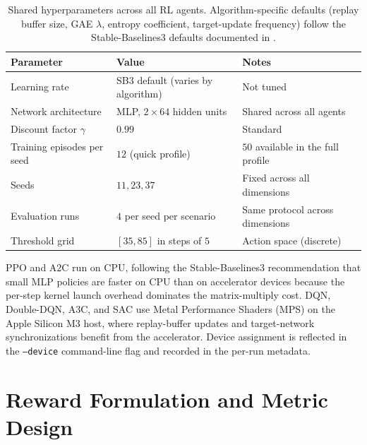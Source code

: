 \documentclass[12pt,a4paper]{article}
\begin{document}
\begin{table}[H]
    \centering
    \small
    \begin{tabular}{p{} p{} p{}}
        \toprule
        Parameter                  & Value                             & Notes                              \\
        \midrule
        Learning rate              & SB3 default (varies by algorithm) & Not tuned                          \\
        Network architecture       & MLP, $2 \times 64$ hidden units   & Shared across all agents           \\
        Discount factor $\gamma$   & $0.99$                            & Standard                           \\
        Training episodes per seed & $12$ (quick profile)              & $50$ available in the full profile \\
        Seeds                      & $11, 23, 37$                      & Fixed across all dimensions        \\
        Evaluation runs            & $4$ per seed per scenario         & Same protocol across dimensions    \\
        Threshold grid             & $[35, 85]$ in steps of $5$        & Action space (discrete)            \\
        \bottomrule
    \end{tabular}
    \caption{Shared hyperparameters across all RL agents. Algorithm-specific defaults (replay buffer size, GAE $\lambda$, entropy coefficient, target-update frequency) follow the Stable-Baselines3 defaults documented in \cite{stable_baselines3}.}
    \label{tab:en-hyperparams}
\end{table}

PPO and A2C run on CPU, following the Stable-Baselines3 recommendation that small MLP policies are faster on CPU than on accelerator devices because the per-step kernel launch overhead dominates the matrix-multiply cost. DQN, Double-DQN, A3C, and SAC use Metal Performance Shaders (MPS) on the Apple Silicon M3 host, where replay-buffer updates and target-network synchronizations benefit from the accelerator. Device assignment is reflected in the \texttt{--device} command-line flag and recorded in the per-run metadata.

\section{Reward Formulation and Metric Design}
\end{document}

